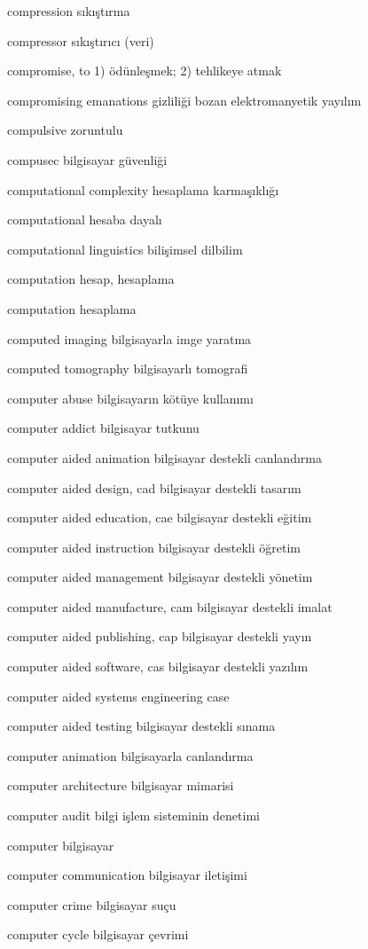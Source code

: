 \documentclass[12pt,fleqn]{article}\usepackage{../../common}
\begin{document}
compression sıkıştırma

compressor sıkıştırıcı (veri)

compromise, to 1) ödünleşmek; 2) tehlikeye atmak

compromising emanations gizliliği bozan elektromanyetik yayılım

compulsive zoruntulu

compusec bilgisayar güvenliği

computational complexity hesaplama karmaşıklığı

computational hesaba dayalı

computational linguistics bilişimsel dilbilim

computation hesap, hesaplama

computation hesaplama

computed imaging bilgisayarla imge yaratma

computed tomography bilgisayarlı tomografi

computer abuse bilgisayarın kötüye kullanımı

computer addict bilgisayar tutkunu

computer aided animation bilgisayar destekli canlandırma

computer aided design, cad bilgisayar destekli tasarım

computer aided education, cae bilgisayar destekli eğitim

computer aided instruction bilgisayar destekli öğretim

computer aided management bilgisayar destekli yönetim

computer aided manufacture, cam bilgisayar destekli imalat

computer aided publishing, cap bilgisayar destekli yayın

computer aided software, cas bilgisayar destekli yazılım

computer aided systems engineering case

computer aided testing bilgisayar destekli sınama

computer animation bilgisayarla canlandırma

computer architecture bilgisayar mimarisi

computer audit bilgi işlem sisteminin denetimi

computer bilgisayar

computer communication bilgisayar iletişimi

computer crime bilgisayar suçu

computer cycle bilgisayar çevrimi
\end{document}
